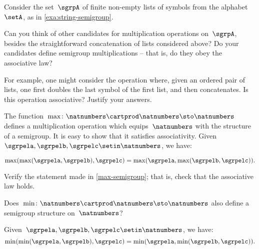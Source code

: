 \begin{gradedexercise}
    \label{ex:VariationsOnConcatenation}
    \label{ex:alphabet}
    Consider the set~$\sgrpA$ of finite non-empty lists of symbols from the alphabet~$\setA$, as in \cref{exa:string-semigroup}.

    Can you think of other candidates for multiplication operations on~$\sgrpA$, besides the straightforward concatenation of lists considered above?
    Do your candidates define semigroup multiplications -- that is, do they obey the associative law?

    For example, one might consider the operation where, given an ordered pair of lists, one first doubles the last symbol of the first list, and then concatenates.
    Is this operation associative?
    Justify your answers.
\end{gradedexercise}

\begin{example}
    \label{max-semigroup}

    The function~$\max \colon \natnumbers \cartprod \natnumbers \sto \natnumbers$ defines a multiplication operation which equips~$\natnumbers$ with the structure of a semigroup.
    It is easy to show that it satisfies associativity.
    Given~$\sgrpela,\sgrpelb,\sgrpelc\setin \natnumbers$, we have:

    \begin{equation*}
        \label{eq:max-assoc}
        \max(\max(\sgrpela,\sgrpelb),\sgrpelc)
        =
        \max(\sgrpela,\max(\sgrpelb,\sgrpelc)).
    \end{equation*}
\end{example}

\begin{exercise}
    \label{ex:max-semigroup}
    Verify the statement made in \cref{max-semigroup}; that is, check that the associative law holds.

    Does~$\min \colon \natnumbers \cartprod \natnumbers \sto \natnumbers$ also define a semigroup structure on~$\natnumbers$?
\end{exercise}
\begin{solution}
    Given~$\sgrpela,\sgrpelb,\sgrpelc\setin \natnumbers$, we have:
    \begin{equation*}
        \label{eq:min-assoc}
        \min(\min(\sgrpela,\sgrpelb),\sgrpelc)=\min(\sgrpela,\min(\sgrpelb,\sgrpelc)).
    \end{equation*}
\end{solution}

